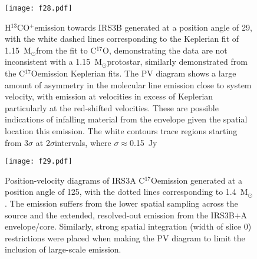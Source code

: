 \documentclass[twocolumn, 12pt]{aastex63}
\newcommand{\cso}{C$^{17}$O}
\newcommand{\htcop}{H$^{13}$CO$^+$}
\renewcommand{\deg}{\degr}
\newcommand{\solm}{M$_{\odot}$}
\begin{document}
\begin{figure}[H]
\begin{center}
\texttt{[image: f28.pdf]}
\end{center}
\caption{\htcop\space emission towards IRS3B generated at a position angle of 29\deg, with the white dashed lines corresponding to the Keplerian fit of 1.15~\solm\space from the fit to \cso, demonstrating the data are not inconsistent with a 1.15~\solm\space protostar, similarly demonstrated from the \cso\space emission Keplerian fits. The PV diagram shows a large amount of asymmetry in the molecular line emission close to system velocity, with emission  at velocities in  excess of Keplerian particularly at the red-shifted velocities. These are possible indications of infalling material from the envelope given the spatial location this emission. The white contours trace regions starting from 3$\sigma$ at 2$\sigma$\space intervals, where $\sigma\approx$0.15~Jy}\label{fig:l1448irs3b_h13cop_pv}
\end{figure}






\begin{figure}[H]
\begin{center}
\texttt{[image: f29.pdf]}
\end{center}
\caption{Position-velocity diagrams of IRS3A \cso\space emission generated at a position angle of 125\deg, with the dotted lines corresponding to 1.4~\solm. The emission suffers from the lower spatial sampling across the source and the extended, resolved-out emission from the IRS3B$+$A envelope/core. Similarly, strong spatial integration (width of slice 0) restrictions were placed when making the PV diagram to limit the inclusion of large-scale emission. }\label{fig:l1448irs3a_cso_pv}
\end{figure}
\end{document}
